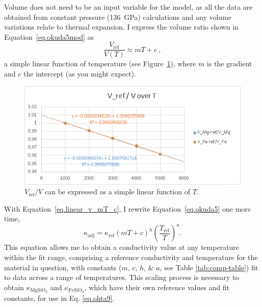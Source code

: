 Volume does not need to be an input variable for the model, as all the data are obtained from constant pressure (136~GPa) calculations and any volume variations relate to thermal expansion. I express the volume ratio shown in Equation~\ref{eq.okuda5mod} as 
%
\begin{equation}
\frac{V_{\mathrm{ref}}}{V(T)} \approx  mT+c \ ,
\label{eq.linear_v_mT_c}
\end{equation}
%
a simple linear function of temperature (see Figure~\ref{fig:draft_VrefV-T}), where $m$ is the gradient and $c$ the intercept (as you might expect). 

\begin{figure}[h!]
  \includegraphics[width=\linewidth]{Figures/draft_VrefV-T.png}
  \caption[CONTENTS BIT]{$V_{\mathrm{ref}}/V$ can be expressed as a simple linear function of $T$.}
  \label{fig:draft_VrefV-T}
\end{figure}

With Equation~\ref{eq.linear_v_mT_c}, I rewrite Equation~\ref{eq.okuda5} one more time,
%
\begin{equation}
\kappa_{\mathrm{adj}}=\kappa_{\mathrm{ref}} \left ( mT+c \right )^{h} \left ( \frac{T_{\mathrm{ref}}}{T} \right )^{a}.
\label{eq.okuda5modmod}
\end{equation}
%
This equation allows me to obtain a conductivity value at any temperature within the fit range, comprising a reference conductivity and temperature for the material in question, with constants ($m$, $c$, $h$, \& $a$, see Table \ref{tab:comp-table}) fit to data across a range of temperatures. This scaling process is necessary to obtain $\kappa_{\mathrm{MgSiO_{3}}}$ and $\kappa_{\mathrm{FeSiO_{3}}}$, which have their own reference values and fit constants, for use in Eq. \ref{eq.ohta9}.


